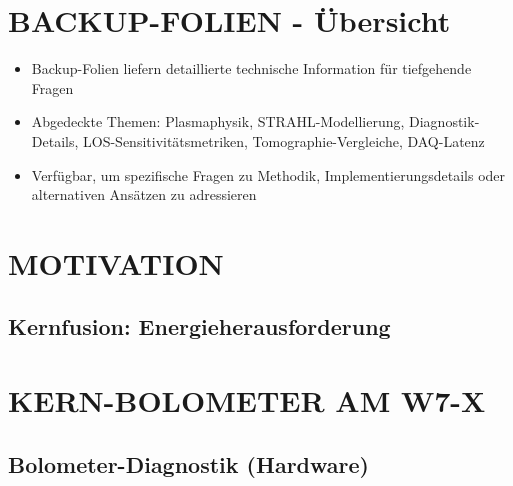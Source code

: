 \documentclass[11pt,a4paper]{article}
\begin{document}
\section{BACKUP-FOLIEN - Übersicht}


\begin{itemize}
\item Backup-Folien liefern detaillierte technische Information für tiefgehende Fragen
\item Abgedeckte Themen: Plasmaphysik, STRAHL-Modellierung, Diagnostik-Details, LOS-Sensitivitätsmetriken, Tomographie-Vergleiche, DAQ-Latenz
\item Verfügbar, um spezifische Fragen zu Methodik, Implementierungsdetails oder alternativen Ansätzen zu adressieren
\end{itemize}

\vspace{1em}


\section{MOTIVATION}

\subsection{Kernfusion: Energieherausforderung}

\begin{itemize}
\end{itemize}

\section{KERN-BOLOMETER AM W7-X}

\subsection{Bolometer-Diagnostik (Hardware)}
\end{document}
